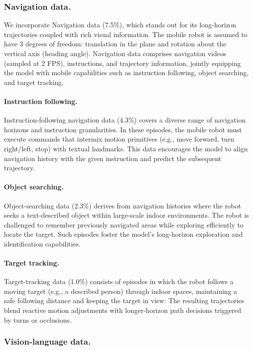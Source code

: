 \documentclass{llmxive}
\begin{document}
\subsubsection{Navigation data.}

We incorporate Navigation data (7.5\%), which stands out for its long-horizon trajectories coupled with rich visual information. The mobile robot is assumed to have 3 degrees of freedom: translation in the plane and rotation about the vertical axis (heading angle). Navigation data comprises navigation videos (sampled at 2 FPS), instructions, and trajectory information, jointly equipping the model with mobile capabilities such as instruction following, object searching, and target tracking.

\paragraph{Instruction following.} Instruction-following navigation data (4.3\%) covers a diverse range of navigation horizons and instruction granularities. In these episodes, the mobile robot must execute commands that intermix motion primitives (e.g., move forward, turn right/left, stop) with textual landmarks. This data encourages the model to align navigation history with the given instruction and predict the subsequent trajectory.

\paragraph{Object searching.} Object-searching data (2.3\%) derives from navigation histories where the robot seeks a text-described object within large-scale indoor environments. The robot is challenged to remember previously navigated areas while exploring efficiently to locate the target. Such episodes foster the model's long-horizon exploration and identification capabilities.

\paragraph{Target tracking.} Target-tracking data (1.0\%) consists of episodes in which the robot follows a moving target (e.g., a described person) through indoor spaces, maintaining a safe following distance and keeping the target in view. The resulting trajectories blend reactive motion adjustments with longer-horizon path decisions triggered by turns or occlusions.


\subsubsection{Vision-language data.}
\label{sec:vl-data}
\end{document}
